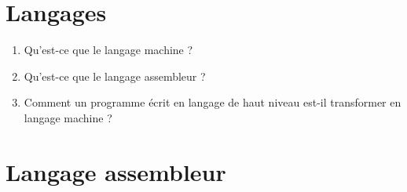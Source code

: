 \documentclass[12pt,a4paper]{article}
\begin{document}
\section*{Langages}

\begin{enumerate}
\item Qu'est-ce que le langage machine ? \vspace{3cm}
\item Qu'est-ce que le langage assembleur ? \vspace{3cm}
\item Comment un programme écrit en langage de haut niveau est-il transformer en langage machine ?\vspace{3cm}
\end{enumerate}


\section*{Langage assembleur}
\end{document}
